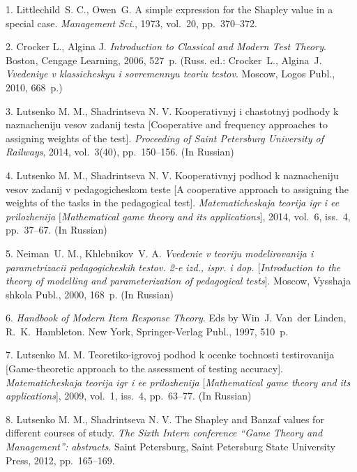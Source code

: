 

{\footnotesize

\vskip 4mm


\vskip 4mm








1. Littlechild~S. C., Owen~G. A simple expression for the Shapley
value in a special case. {\it Management Sci.}, 1973, vol.~20,
pp.~370--372.

2. Crocker L., Algina J.  {\it Introduction to Classical and
Modern Test Theory}. Boston, Cengage Learning, 2006, 527~p. (Russ.
ed.: Crocker~L., Algina~J. {\it Vvedeniye v klassicheskyu i
sovremennyu teoriu testov}. Moscow, Logos Publ., 2010,
668~p.)\newpage

3.  Lutsenko M. M., Shadrintseva N. V. Kooperativnyj i chastotnyj
podhody k naznacheniju vesov zadanij testa [Cooperative and
frequency approaches to assigning weights of the test]. {\it
Proceeding of Saint Petersburg University of  Railways}, 2014,
vol.~3(40), pp.~150--156. (In Russian)

4. Lutsenko M. M., Shadrintseva N. V. Kooperativnyj podhod k
naznacheniju vesov zadanij v pedagogicheskom teste [A cooperative
approach to assigning the weights of the tasks in the pedagogical
test]. {\it Matematicheskaja teorija igr i ee prilozhenija
$[$Mathematical game theory and its applications}], 2014, vol.~6,
iss.~4,  pp.~37--67. (In Russian)

5. Neiman~U. M., Khlebnikov~V. A. {\it Vvedenie v teoriju
modelirovanija i parametrizacii pedagogicheskih testov. 2-e izd.,
ispr. i dop. $[$Introduction to the theory of modelling and
parameterization of pedagogical tests}]. Moscow, Vysshaja shkola
Publ., 2000, 168~p. (In Russian)

6. {\it Handbook of Modern Item Response Theory}. Eds by Win~J.
Van~der Linden, R.~K.~Hambleton. New York, Springer-Verlag Publ.,
1997, 510~p.

7. Lutsenko M. M. Teoretiko-igrovoj podhod k ocenke tochnosti
testirovanija  [Game-theoretic approach to the assessment of
testing accuracy]. \textit{Matematicheskaja teorija igr i ee
prilozhenija $[$Mathematical game theory and its applications}],
2009, vol.~1, iss.~4,  pp.~63--77. (In Russian)

8. Lutsenko M. M., Shadrintseva N. V.  The Shapley and Banzaf
values for different courses of study. {\it The Sixth Intern
conference ``Game Theory and Management'': abstracts}. Saint
Petersburg, Saint Petersburg State University Press, 2012,
pp.~165--169.

}
